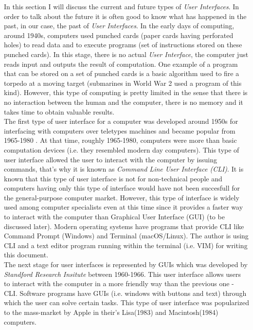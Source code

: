 \documentclass[]{article}
\begin{document}
	In this section I will discuss the current and future types of \textit{User Interfaces}. In order to talk about the future it is often good to know what has happened in the past, in our case, the past of \textit{User Interfaces}. In the early days of computing, around 1940s, computers used punched cards (paper cards having perforated holes) to read data and to execute programs (set of instructions stored on these punched cards). In this stage, there is no actual \textit{User Interface}, the computer just reads input and outputs the result of computation. One example of a program that can be stored on a set of punched cards is a basic algorithm used to fire a torpedo at a moving target (submarines in World War 2 used a program of this kind). However, this type of computing is pretty limited in the sense that there is no interaction between the human and the computer, there is no memory and it takes time to obtain valuable results. \\

	\indent 
	The first type of user interface for a computer was developed around 1950s for interfacing with computers over teletypes machines and became popular from 1965-1980  . At that time, roughly 1965-1980, computers were more than basic computation devices (i.e. they resembled modern day computers). This type of user interface allowed the user to interact with the computer by issuing commands, that's why it is known as \textit{Command Line User Interface (CLI)}. It is known that this type of user interface is not for non-technical people and computers having only this type of interface would have not been succesfull for the general-purpose computer market. However, this type of interface is widely used among computer specialists even at this time since it provides a faster way to interact with the computer than Graphical User Interface (GUI) (to be discussed later). Modern operating systems have programs that provide CLI like Command Prompt (Windows) and Terminal (macOS/Linux). The author is using CLI and a text editor program running within the terminal (i.e. VIM) for writing this document. \\

	\indent
	The next stage for user interfaces is represented by GUIs which was developed by \textit{Standford Research Insitute} between 1960-1966. This user interface allows  users to interact with the computer in a more friendly way than the previous one - CLI. Software programs have GUIs (i.e. windows with buttons and text) through which the user can  solve certain tasks. This type of user interface was popularized to the mass-market by Apple in their's Lisa(1983) and Macintosh(1984) computers.\\
\end{document}
